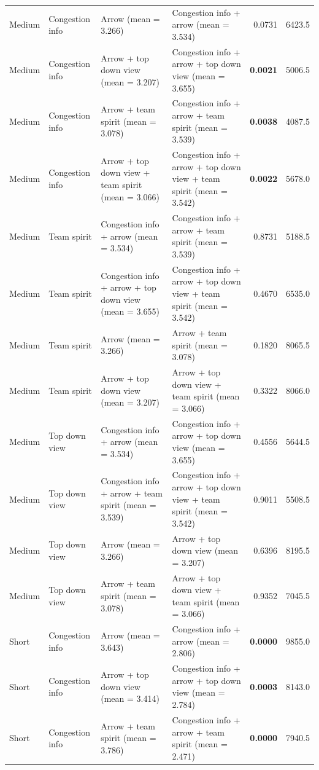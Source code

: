\begin{table}
\begin{scriptsize}
\begin{tabular}{llllrr}
    \hline
  Medium & Congestion info & Arrow (mean = 3.266) & Congestion info + arrow (mean = 3.534) & 0.0731 & 6423.5 \\
  Medium & Congestion info & Arrow + top down view (mean = 3.207) & Congestion info + arrow + top down view (mean = 3.655) & \textbf{0.0021} & 5006.5 \\
  Medium & Congestion info & Arrow + team spirit (mean = 3.078) & Congestion info + arrow + team spirit (mean = 3.539) & \textbf{0.0038} & 4087.5 \\
  Medium & Congestion info & Arrow + top down view + team spirit (mean = 3.066) & Congestion info + arrow + top down view + team spirit (mean = 3.542) & \textbf{0.0022} & 5678.0 \\
  Medium & Team spirit & Congestion info + arrow (mean = 3.534) & Congestion info + arrow + team spirit (mean = 3.539) & 0.8731 & 5188.5 \\
  Medium & Team spirit & Congestion info + arrow + top down view (mean = 3.655) & Congestion info + arrow + top down view + team spirit (mean = 3.542) & 0.4670 & 6535.0 \\
  Medium & Team spirit & Arrow (mean = 3.266) & Arrow + team spirit (mean = 3.078) & 0.1820 & 8065.5 \\
  Medium & Team spirit & Arrow + top down view (mean = 3.207) & Arrow + top down view + team spirit (mean = 3.066) & 0.3322 & 8066.0 \\
  Medium & Top down view & Congestion info + arrow (mean = 3.534) & Congestion info + arrow + top down view (mean = 3.655) & 0.4556 & 5644.5 \\
  Medium & Top down view & Congestion info + arrow + team spirit (mean = 3.539) & Congestion info + arrow + top down view + team spirit (mean = 3.542) & 0.9011 & 5508.5 \\
  Medium & Top down view & Arrow (mean = 3.266) & Arrow + top down view (mean = 3.207) & 0.6396 & 8195.5 \\
  Medium & Top down view & Arrow + team spirit (mean = 3.078) & Arrow + top down view + team spirit (mean = 3.066) & 0.9352 & 7045.5 \\
  \hline
  Short & Congestion info & Arrow (mean = 3.643) & Congestion info + arrow (mean = 2.806) & \textbf{0.0000} & 9855.0 \\
  Short & Congestion info & Arrow + top down view (mean = 3.414) & Congestion info + arrow + top down view (mean = 2.784) & \textbf{0.0003} & 8143.0 \\
  Short & Congestion info & Arrow + team spirit (mean = 3.786) & Congestion info + arrow + team spirit (mean = 2.471) & \textbf{0.0000} & 7940.5 \\

\end{tabular}
\end{scriptsize}
\end{table}
